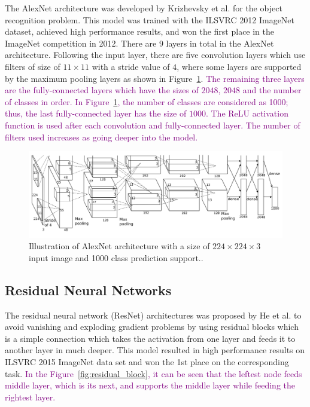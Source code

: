 The AlexNet architecture was developed by Krizhevsky et al. \cite{AlexNet} for the object recognition problem. This model was trained with the ILSVRC 2012 ImageNet \cite{imagenet} dataset, achieved high performance results, and won the first place in the ImageNet competition in 2012. There are $9$ layers in total in the AlexNet architecture. Following the input layer, there are five convolution layers which use filters of size of $11 \times 11$ with a stride value of $4$, where some layers are supported by the maximum pooling layers as shown in Figure~\ref{fig:alexnet_arch}. \textcolor{purple}{The remaining three layers are the fully-connected layers which have the sizes of $2048$, $2048$ and the number of classes in order. In Figure~\ref{fig:alexnet_arch}, the number of classes are considered as 1000; thus, the last fully-connected layer has the size of $1000$.  The ReLU activation function is used after each convolution and fully-connected layer. The number of filters used increases as going deeper into the model.}

\begin{figure}[h]
    \centering
    \includegraphics[width=\linewidth]{fig/alexnet_arch.png}
    \caption{Illustration of AlexNet architecture with a size of $224 \times 224 \times 3$ input image and 1000 class prediction support.\cite{AlexNet}.}
    \label{fig:alexnet_arch}
\end{figure}

\subsection{Residual Neural Networks}

The residual neural network (ResNet) architectures was proposed by He et al. \cite{ResNet} to avoid vanishing and exploding gradient problems by using residual blocks which is a simple connection which takes the activation from one layer and feeds it to another layer in much deeper. This model resulted in high performance results on ILSVRC 2015 ImageNet \cite{imagenet} data set and won the 1st place on the corresponding task. \textcolor{purple}{In the Figure~\ref{fig:residual_block}, it can be seen that the leftest node feeds middle layer, which is its next, and supports the middle layer while feeding the rightest layer.}


